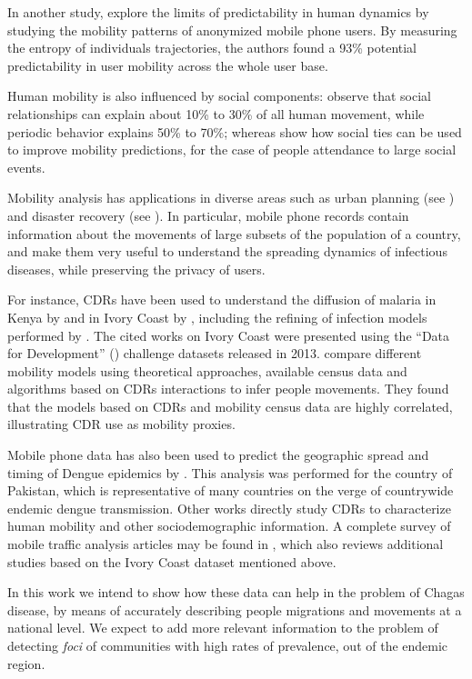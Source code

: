 In another study, \citep{song2010limits} explore the limits of predictability in human dynamics by studying the mobility patterns of anonymized mobile phone users.
By measuring the entropy of individuals trajectories, the authors found a 93\% potential predictability in user mobility across the whole user base.

Human mobility is also influenced by social components: \citep{cho2011friendship} observe that social relationships
can explain about 10\% to 30\% of all human movement, while periodic
behavior explains 50\% to 70\%; whereas \citep{ponieman2016mobility} show how social ties can be used to improve mobility predictions, for the case of people attendance to large social events.

Mobility analysis has applications in diverse areas such as urban planning (see \citep{wang2012understanding}) and disaster recovery (see \citep{lu2012predictability}).
In particular, mobile phone records contain information about the movements of large subsets of the population of a country, and make them very useful to understand the spreading dynamics of infectious diseases, while preserving the privacy of users.

For instance, CDRs have been used to understand the diffusion of malaria in Kenya by \citep{wesolowski2012quantifying} and in Ivory Coast by \citep{enns2013human}, including the refining of infection models performed by \citep{chunara2013large}.
The cited works on Ivory Coast were presented using the ``Data for Development'' (\citep{d4d}) challenge datasets released in 2013. \citep{tizzoni2014use} compare different mobility models using theoretical approaches, available census data and algorithms based on CDRs interactions to infer people movements.
They found that the models based on CDRs and mobility census data are highly correlated, illustrating CDR use as mobility proxies.

Mobile phone data has also been used to predict the geographic spread and timing of Dengue epidemics by \citep{wesolowski2015impact}.
This analysis was performed for the country of Pakistan, which is representative of many countries on the verge of countrywide endemic dengue transmission.
Other works directly study CDRs to characterize human mobility and other sociodemographic information.
A complete survey of mobile traffic analysis articles may be found in \citep{naboulsi2015mobile}, which also reviews additional studies based on the Ivory Coast dataset mentioned above.

In this work we intend to show how these data can help in the problem of Chagas disease, by means of accurately describing people migrations and movements at a national level.
We expect to add more relevant information to the problem of detecting \textit{foci} of communities with high rates of prevalence, out of the endemic region.

